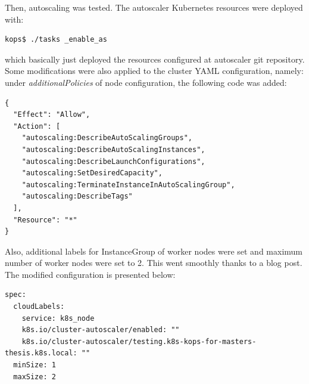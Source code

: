 Then, autoscaling was tested. The autoscaler Kubernetes resources were deployed with:
\begin{lstlisting}[basicstyle=\tiny,caption={Bash command to deploy autoscaker}]
kops$ ./tasks _enable_as
\end{lstlisting}
which basically just deployed the resources configured at autoscaler git repository\cite{as-github}. Some modifications were also applied to the cluster YAML configuration, namely: under \textit{additionalPolicies} of node configuration, the following code was added:
\begin{lstlisting}[basicstyle=\tiny,caption={IAM Policies needed by autoscaler}]
{
  "Effect": "Allow",
  "Action": [
    "autoscaling:DescribeAutoScalingGroups",
    "autoscaling:DescribeAutoScalingInstances",
    "autoscaling:DescribeLaunchConfigurations",
    "autoscaling:SetDesiredCapacity",
    "autoscaling:TerminateInstanceInAutoScalingGroup",
    "autoscaling:DescribeTags"
  ],
  "Resource": "*"
}
\end{lstlisting}
Also, additional labels for InstanceGroup of worker nodes were set and maximum number of worker nodes were set to 2. This went smoothly thanks to a blog post\cite{as-blog}. The modified configuration is presented below:
\begin{lstlisting}[basicstyle=\tiny,caption={Kops cluster YAML configuration needed for autoscaler}]
spec:
  cloudLabels:
    service: k8s_node
    k8s.io/cluster-autoscaler/enabled: ""
    k8s.io/cluster-autoscaler/testing.k8s-kops-for-masters-thesis.k8s.local: ""
  minSize: 1
  maxSize: 2
\end{lstlisting}

